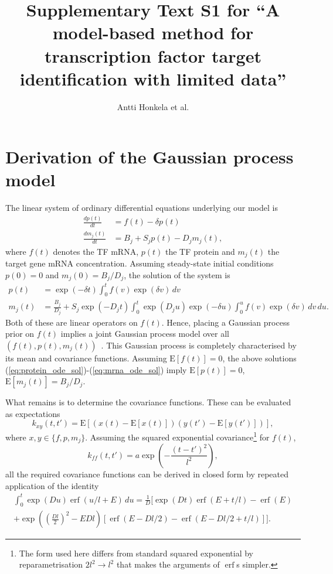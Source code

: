\documentclass{article}
\title{Supplementary Text S1 for ``A model-based method for
  transcription factor target identification with limited data''}
\author{Antti Honkela et al.}
\date{}
\newcommand{\erf}{\operatorname{erf}}
\begin{document}
\maketitle

\section{Derivation of the Gaussian process model}

The linear system of ordinary differential equations underlying our model is
\begin{align}
  \label{eq:translation_ode}
  \frac{dp(t)}{dt} & = f(t) - \delta p(t) \\
  \label{eq:translation_ode}
  \frac{dm_j(t)}{dt} & = B_j + S_j p(t) - D_j m_j(t),
\end{align}
where $f(t)$ denotes the TF mRNA, $p(t)$ the
TF protein and $m_j(t)$ the target gene mRNA concentration.
Assuming steady-state initial conditions $p(0) = 0$ and
$m_j(0) = B_j / D_j$, the solution of the system is
\begin{align}
  \label{eq:protein_ode_sol}
  p(t) & = \exp(-\delta t) \int_0^t f(v) \exp(\delta v) \, dv \\
  \label{eq:mrna_ode_sol}
  m_j(t) & = \frac{B_j}{D_j} + S_j \exp(-D_j t) \int_0^t \exp(D_j
  u) \exp(-\delta u) \int_0^u f(v) \exp(\delta v) \, dv \, du.
\end{align}
Both of these are linear operators on $f(t)$.  Hence, placing a
Gaussian process prior on $f(t)$ implies a joint Gaussian process
model over all $(f(t), p(t), m_j(t))$~\cite{Rasmussen2006,Lawrence2007}.
This Gaussian process is completely characterised by its mean and
covariance functions.  Assuming $\mathrm{E}[f(t)] = 0$, the above
solutions (\ref{eq:protein_ode_sol})-(\ref{eq:mrna_ode_sol}) imply
$\mathrm{E}[p(t)] = 0$, $\mathrm{E}[m_j(t)] = B_j / D_j$.

What remains is to determine the covariance functions.  These can
be evaluated as expectations
\begin{equation}
  \label{eq:kernel_definition}
  k_{xy}(t,t') = \mathrm{E}[(x(t) - \mathrm{E}[x(t)])(y(t') - \mathrm{E}[y(t')])],
\end{equation}
where $x,y \in \{f, p, m_j\}$.  Assuming the squared exponential
covariance\footnote{The form used here differs from standard squared
  exponential by reparametrisation $2l^2 \rightarrow l^2$ that makes
  the arguments of $\erf$s simpler.} for $f(t)$,
\begin{equation}
  \label{eq:sqexp_kernel}
  k_{ff}(t, t') = a \exp\left( -\frac{(t-t')^2}{l^2} \right),
\end{equation}
all the required covariance functions can be derived in closed form
by repeated application of the identity
\begin{multline}
  \label{eq:gpsim_identity}
  \int_0^t \exp(D u) \erf(u/l + E)\,du =
  \frac{1}{D} \bigg[
  \exp(Dt) \erf(E + t/l) - \erf(E) \\
  + \exp\left(\left( \frac{Dl}{2}\right)^2 -E Dl \right)
  [ \erf(E - Dl/2) - \erf(E-Dl/2+t/l) ]
  \bigg].
\end{multline}
\end{document}
